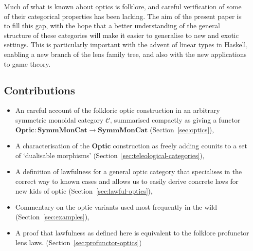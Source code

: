 \documentclass[11pt,letterpaper]{article}
\theoremstyle{plain}
\theoremstyle{definition}
\newcommand{\C}{\mathscr{C}}
\newcommand{\SymmMonCat}{\mathbf{SymmMonCat}}
\newcommand{\Optic}{\mathbf{Optic}}
\newcommand{\todo}[1]{\textcolor{red}{\small #1}}
\begin{document}
Much of what is known about optics is folklore, and careful verification of some of their categorical properties has been lacking. The aim of the present paper is to fill this gap, with the hope that a better understanding of the general structure of these categories will make it easier to generalise to new and exotic settings. This is particularly important with the advent of linear types in Haskell, enabling a new branch of the lens family tree, and also with the new applications to game theory.

\subsection{Contributions}
  \begin{itemize}
  \item An careful account of the folkloric optic construction in an arbitrary symmetric monoidal category $\C$, summarised compactly as giving a functor $\Optic : \SymmMonCat \to \SymmMonCat$ (Section~\ref{sec:optics}),
  \item A characterisation of the $\Optic$ construction as freely adding counits to a set of `dualisable morphisms' (Section~\ref{sec:teleological-categories}),
  \item A definition of lawfulness for a general optic category that specialises in the correct way to known cases and allows us to easily derive concrete laws for new kids of optic (Section~\ref{sec:lawful-optics}),
  \item Commentary on the optic variants used most frequently in the wild (Section~\ref{sec:examples}),
  \item A proof that lawfulness as defined here is equivalent to the folklore profunctor lens laws. (Section~\ref{sec:profunctor-optics})
  \end{itemize}

\end{document}
